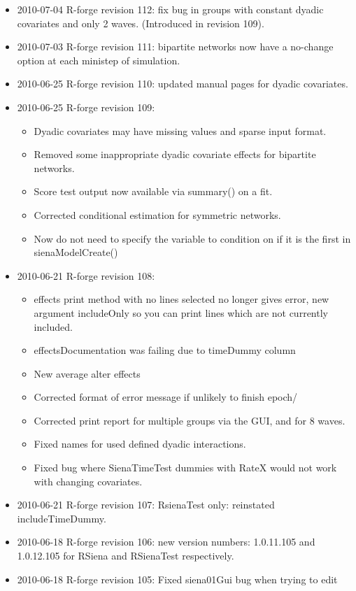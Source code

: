 \documentclass[a4paper,fleqn,11pt]{article}
\newcommand{\+}{\, + \,}
\newcommand{\sfn}[1]{\textsf{#1}}
\begin{document}
\begin{small}
\begin{itemize}
\item 2010-07-04 R-forge revision 112: fix bug in groups with constant dyadic
  covariates and only 2 waves. (Introduced in revision 109).
\item 2010-07-03 R-forge revision 111: bipartite networks now have a no-change
  option at each ministep of simulation.
\item 2010-06-25 R-forge revision 110: updated manual pages for dyadic
  covariates.
\item 2010-06-25 R-forge revision 109:
\begin{itemize}
\item Dyadic covariates may have missing values and sparse input format.
\item Removed some inappropriate dyadic covariate effects for bipartite
  networks.
\item Score test output now available via summary() on a fit.
\item Corrected conditional estimation for symmetric networks.
\item Now do not need to specify the variable to condition on if it is the first
  in \sfn{sienaModelCreate()}
\end{itemize}
\item 2010-06-21 R-forge revision 108:
\begin{itemize}
\item effects print method with no lines selected no longer gives error, new
  argument includeOnly so you can print lines which are not currently included.
\item effectsDocumentation was failing due to timeDummy column
\item New average alter effects
\item Corrected format of error message if unlikely to finish epoch/
\item Corrected print report for multiple groups via the GUI, and for 8 waves.
\item Fixed names for used defined dyadic interactions.
\item Fixed bug where SienaTimeTest dummies with RateX would not work with
  changing covariates.
\end{itemize}
\item 2010-06-21 R-forge revision 107: RsienaTest only: reinstated
includeTimeDummy.
\item 2010-06-18 R-forge revision 106: new version numbers:
  1.0.11.105 and 1.0.12.105 for RSiena and RSienaTest respectively.
\item 2010-06-18 R-forge revision 105: Fixed siena01Gui bug when trying to edit

\end{itemize}
\end{small}
\end{document}
